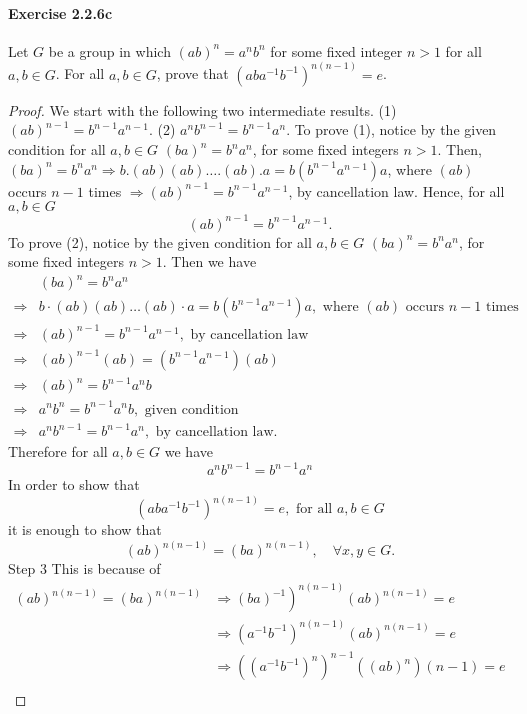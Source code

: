 \documentclass{article}
\begin{document}
\paragraph{Exercise 2.2.6c} Let $G$ be a group in which $(a b)^{n}=a^{n} b^{n}$ for some fixed integer $n>1$ for all $a, b \in G$. For all $a, b \in G$, prove that $\left(a b a^{-1} b^{-1}\right)^{n(n-1)}=e$. 
\begin{proof}
    We start with the following two intermediate results.
(1) $(a b)^{n-1}=b^{n-1} a^{n-1}$.
(2) $a^n b^{n-1}=b^{n-1} a^n$.
To prove (1), notice by the given condition for all $a, b \in G$
$(b a)^n=b^n a^n$, for some fixed integers $n>1$.
Then,
$(b a)^n=b^n a^n \Longrightarrow b .(a b)(a b) \ldots .(a b) . a=b\left(b^{n-1} a^{n-1}\right) a$, where $(a b)$ occurs $n-1$ times $\Longrightarrow(a b)^{n-1}=b^{n-1} a^{n-1}$, by cancellation law.
Hence, for all $a, b \in G$
$$
(a b)^{n-1}=b^{n-1} a^{n-1} .
$$
To prove (2), notice by the given condition for all $a, b \in G$
$(b a)^n=b^n a^n$, for some fixed integers $n>1$.
Then we have
$$
\begin{aligned}
& (b a)^n=b^n a^n \\
\Longrightarrow & b \cdot(a b)(a b) \ldots(a b) \cdot a=b\left(b^{n-1} a^{n-1}\right) a, \text { where }(a b) \text { occurs } n-1 \text { times } \\
\Longrightarrow & (a b)^{n-1}=b^{n-1} a^{n-1}, \text { by cancellation law } \\
\Longrightarrow & (a b)^{n-1}(a b)=\left(b^{n-1} a^{n-1}\right)(a b) \\
\Longrightarrow & (a b)^n=b^{n-1} a^n b \\
\Longrightarrow & a^n b^n=b^{n-1} a^n b, \text { given condition } \\
\Longrightarrow & a^n b^{n-1}=b^{n-1} a^n, \text { by cancellation law. }
\end{aligned}
$$
Therefore for all $a, b \in G$ we have
$$
a^n b^{n-1}=b^{n-1} a^n
$$
In order to show that
$$
\left(a b a^{-1} b^{-1}\right)^{n(n-1)}=e, \text { for all } a, b \in G
$$
it is enough to show that
$$
(a b)^{n(n-1)}=(b a)^{n(n-1)}, \quad \forall x, y \in G .
$$
Step 3
This is because of
$$
\begin{aligned}
(a b)^{n(n-1)}=(b a)^{n(n-1)} & \left.\Longrightarrow(b a)^{-1}\right)^{n(n-1)}(a b)^{n(n-1)}=e \\
& \Longrightarrow\left(a^{-1} b^{-1}\right)^{n(n-1)}(a b)^{n(n-1)}=e \\
& \Longrightarrow\left(\left(a^{-1} b^{-1}\right)^n\right)^{n-1}\left((a b)^n\right)(n-1)=e \\

\end{aligned}$$
\end{proof}
\end{document}
